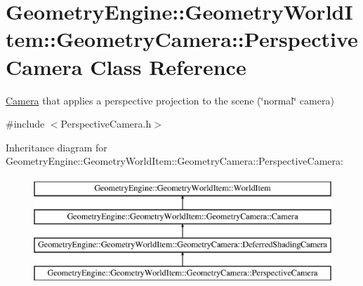 \hypertarget{class_geometry_engine_1_1_geometry_world_item_1_1_geometry_camera_1_1_perspective_camera}{}\section{Geometry\+Engine\+::Geometry\+World\+Item\+::Geometry\+Camera\+::Perspective\+Camera Class Reference}
\label{class_geometry_engine_1_1_geometry_world_item_1_1_geometry_camera_1_1_perspective_camera}


\mbox{\hyperlink{class_geometry_engine_1_1_geometry_world_item_1_1_geometry_camera_1_1_camera}{Camera}} that applies a perspective projection to the scene (\char`\"{}normal\char`\"{} camera)  




{\ttfamily \#include $<$Perspective\+Camera.\+h$>$}

Inheritance diagram for Geometry\+Engine\+::Geometry\+World\+Item\+::Geometry\+Camera\+::Perspective\+Camera\+:\begin{figure}[H]
\begin{center}
\leavevmode
\includegraphics[height=4.000000cm]{class_geometry_engine_1_1_geometry_world_item_1_1_geometry_camera_1_1_perspective_camera}
\end{center}
\end{figure}
